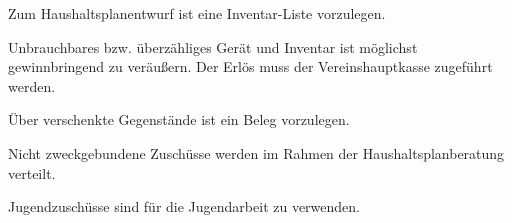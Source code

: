 \begin{finanz}
  Zum Haushaltsplanentwurf ist eine Inventar-Liste vorzulegen.

  Unbrauchbares bzw. überzähliges Gerät und Inventar ist möglichst gewinnbringend zu veräu\ss{}ern. Der Erlös muss der Vereinshauptkasse zugeführt werden.

  Über verschenkte Gegenstände ist ein Beleg vorzulegen.


  Nicht zweckgebundene Zuschüsse werden im Rahmen der Haushaltsplanberatung verteilt.

  Jugendzuschüsse sind für die Jugendarbeit zu verwenden.

\end{finanz}



